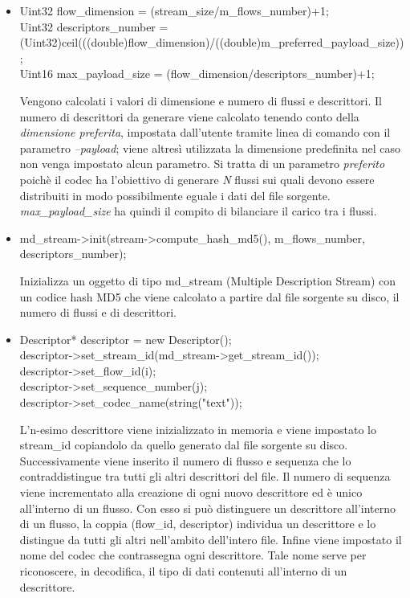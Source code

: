\begin{itemize}
 \item \begin{code}
Uint32 flow\_dimension = (stream\_size/m\_flows\_number)+1;\\
Uint32 descriptors\_number = \\(Uint32)ceil(((double)flow\_dimension)/((double)m\_preferred\_payload\_size));\\
Uint16 max\_payload\_size = (flow\_dimension/descriptors\_number)+1;\\
\end{code}
Vengono calcolati i valori di dimensione e numero di flussi e descrittori. Il numero di descrittori da generare viene calcolato tenendo conto della \emph{dimensione preferita}, impostata dall'utente tramite linea di comando con il parametro \textit{--payload}; viene altres\`i utilizzata la dimensione predefinita nel caso non venga impostato alcun parametro. Si tratta di un parametro \emph{preferito} poich\`e il codec ha l'obiettivo di generare \emph{N} flussi sui quali devono essere distribuiti in modo possibilmente eguale i dati del file sorgente. \textit{max\_payload\_size} ha quindi il compito di bilanciare il carico tra i flussi.
 \item \begin{code}
md\_stream->init(stream->compute\_hash\_md5(), m\_flows\_number, descriptors\_number);\\
\end{code}
Inizializza un oggetto di tipo md\_stream (Multiple Description Stream) con un codice hash MD5 che viene calcolato a partire dal file sorgente su disco, il numero di flussi e di descrittori.
 \item \begin{code}
Descriptor* descriptor = new Descriptor();\\
descriptor->set\_stream\_id(md\_stream->get\_stream\_id());\\
descriptor->set\_flow\_id(i);\\
descriptor->set\_sequence\_number(j);\\
descriptor->set\_codec\_name(string("text"));\\
\end{code}
L'n-esimo descrittore viene inizializzato in memoria e viene impostato lo stream\_id copiandolo da quello generato dal file sorgente su disco. Successivamente viene inserito il numero di flusso e sequenza che lo contraddistingue tra tutti gli altri descrittori del file. Il numero di sequenza viene incrementato alla creazione di ogni nuovo descrittore ed è unico all'interno di un flusso. Con esso si pu\`o distinguere un descrittore all'interno di un flusso, la coppia (flow\_id, descriptor) individua un descrittore e lo distingue da tutti gli altri nell'ambito dell'intero file. Infine viene impostato il nome del codec che contrassegna ogni descrittore. Tale nome serve per riconoscere, in decodifica, il tipo di dati contenuti all'interno di un descrittore.

\end{itemize}
